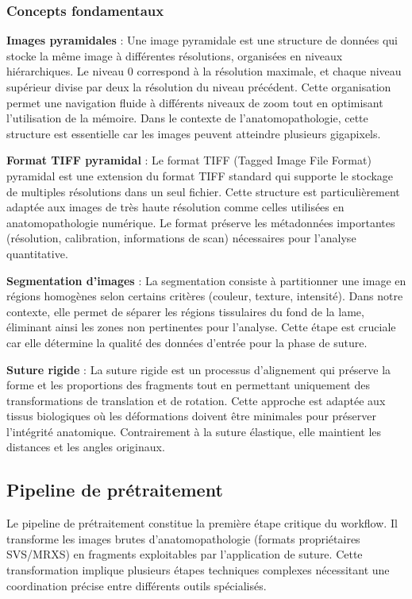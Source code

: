 \subsubsection{Concepts fondamentaux}

\textbf{Images pyramidales} : Une image pyramidale est une structure de données qui stocke la même image à différentes résolutions, organisées en niveaux hiérarchiques. Le niveau 0 correspond à la résolution maximale, et chaque niveau supérieur divise par deux la résolution du niveau précédent. Cette organisation permet une navigation fluide à différents niveaux de zoom tout en optimisant l'utilisation de la mémoire. Dans le contexte de l'anatomopathologie, cette structure est essentielle car les images peuvent atteindre plusieurs gigapixels.

\textbf{Format TIFF pyramidal} : Le format TIFF (Tagged Image File Format) pyramidal est une extension du format TIFF standard qui supporte le stockage de multiples résolutions dans un seul fichier. Cette structure est particulièrement adaptée aux images de très haute résolution comme celles utilisées en anatomopathologie numérique. Le format préserve les métadonnées importantes (résolution, calibration, informations de scan) nécessaires pour l'analyse quantitative.

\textbf{Segmentation d'images} : La segmentation consiste à partitionner une image en régions homogènes selon certains critères (couleur, texture, intensité). Dans notre contexte, elle permet de séparer les régions tissulaires du fond de la lame, éliminant ainsi les zones non pertinentes pour l'analyse. Cette étape est cruciale car elle détermine la qualité des données d'entrée pour la phase de suture.

\textbf{Suture rigide} : La suture rigide est un processus d'alignement qui préserve la forme et les proportions des fragments tout en permettant uniquement des transformations de translation et de rotation. Cette approche est adaptée aux tissus biologiques où les déformations doivent être minimales pour préserver l'intégrité anatomique. Contrairement à la suture élastique, elle maintient les distances et les angles originaux.

\subsection{Pipeline de prétraitement}

Le pipeline de prétraitement constitue la première étape critique du workflow. Il transforme les images brutes d'anatomopathologie (formats propriétaires SVS/MRXS) en fragments exploitables par l'application de suture. Cette transformation implique plusieurs étapes techniques complexes nécessitant une coordination précise entre différents outils spécialisés.


